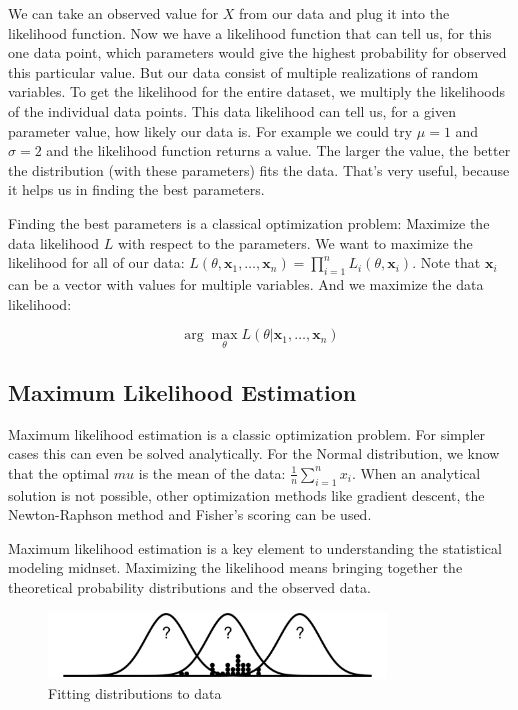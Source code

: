 \documentclass[
  10pt,
]{scrbook}
\begin{document}
We can take an observed value for \(X\) from our data and plug it into the likelihood function.
Now we have a likelihood function that can tell us, for this one data point, which parameters would give the highest probability for observed this particular value.
But our data consist of multiple realizations of random variables.
To get the likelihood for the entire dataset, we multiply the likelihoods of the individual data points.
This data likelihood can tell us, for a given parameter value, how likely our data is.
For example we could try \(\mu = 1\) and \(\sigma = 2\) and the likelihood function returns a value.
The larger the value, the better the distribution (with these parameters) fits the data.
That's very useful, because it helps us in finding the best parameters.

Finding the best parameters is a classical optimization problem:
Maximize the data likelihood \(L\) with respect to the parameters.
We want to maximize the likelihood for all of our data: \(L(\theta, \mathbf{x}_1, \ldots, \mathbf{x}_n) = \prod_{i=1}^n L_i(\theta, \mathbf{x}_i)\).
Note that \(\mathbf{x}_i\) can be a vector with values for multiple variables.
And we maximize the data likelihood:

\[\arg \max_{\theta} L(\theta | \mathbf{x}_1, \ldots, \mathbf{x}_n)\]

\hypertarget{maximum-likelihood-estimation}{%
\subsection*{Maximum Likelihood Estimation}\label{maximum-likelihood-estimation}}


Maximum likelihood estimation is a classic optimization problem.
For simpler cases this can even be solved analytically.
For the Normal distribution, we know that the optimal \(mu\) is the mean of the data: \(\frac{1}{n} \sum_{i=1}^n x_i\).
When an analytical solution is not possible, other optimization methods like gradient descent, the Newton-Raphson method and Fisher's scoring can be used.

Maximum likelihood estimation is a key element to understanding the statistical modeling midnset.
Maximizing the likelihood means bringing together the theoretical probability distributions and the observed data.

\begin{figure}

{\centering \includegraphics[width=0.8\textwidth]{figures/fit-1} 

}

\caption{Fitting distributions to data}\label{fig:fit}
\end{figure}
\end{document}

